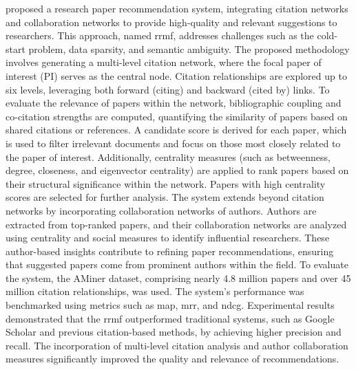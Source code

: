 \textcite{Kanwal2024} proposed a research paper recommendation system, integrating citation networks and collaboration networks to provide high-quality and relevant suggestions to researchers.
This approach, named \gls{rrmf}, addresses challenges such as the cold-start problem, data sparsity, and semantic ambiguity.
The proposed methodology involves generating a multi-level citation network, where the focal paper of interest (PI) serves as the central node.
Citation relationships are explored up to six levels, leveraging both forward (citing) and backward (cited by) links.
To evaluate the relevance of papers within the network, bibliographic coupling and co-citation strengths are computed, quantifying the similarity of papers based on shared citations or references.
A candidate score is derived for each paper, which is used to filter irrelevant documents and focus on those most closely related to the paper of interest.
Additionally, centrality measures (such as betweenness, degree, closeness, and eigenvector centrality) are applied to rank papers based on their structural significance within the network.
Papers with high centrality scores are selected for further analysis.
The system extends beyond citation networks by incorporating collaboration networks of authors.
Authors are extracted from top-ranked papers, and their collaboration networks are analyzed using centrality and social measures to identify influential researchers.
These author-based insights contribute to refining paper recommendations, ensuring that suggested papers come from prominent authors within the field.
To evaluate the system, the AMiner dataset, comprising nearly 4.8 million papers and over 45 million citation relationships, was used.
The system's performance was benchmarked using metrics such as \gls{map}, \gls{mrr}, and \gls{ndcg}.
Experimental results demonstrated that the \gls{rrmf} outperformed traditional systems, such as Google Scholar and previous citation-based methods, by achieving higher precision and recall.
The incorporation of multi-level citation analysis and author collaboration measures significantly improved the quality and relevance of recommendations.

